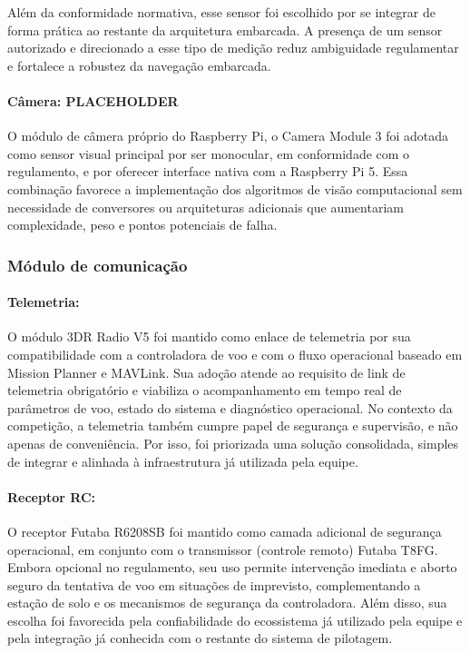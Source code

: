 Além da conformidade normativa, esse sensor foi escolhido por se integrar de forma prática ao restante da arquitetura embarcada. A presença de um sensor autorizado e direcionado a esse tipo de medição reduz ambiguidade regulamentar e fortalece a robustez da navegação embarcada.

\paragraph{Câmera: PLACEHOLDER } 
O módulo de câmera próprio do Raspberry Pi, o Camera Module 3 foi adotada como sensor visual principal por ser monocular, em conformidade com o regulamento, e por oferecer interface nativa com a Raspberry Pi 5. Essa combinação favorece a implementação dos algoritmos de visão computacional sem necessidade de conversores ou arquiteturas adicionais que aumentariam complexidade, peso e pontos potenciais de falha.

\subsubsection{Módulo de comunicação}

\paragraph{Telemetria:}
O módulo 3DR Radio V5 foi mantido como enlace de telemetria por sua compatibilidade com a controladora de voo e com o fluxo operacional baseado em Mission Planner e MAVLink. Sua adoção atende ao requisito de link de telemetria obrigatório e viabiliza o acompanhamento em tempo real de parâmetros de voo, estado do sistema e diagnóstico operacional. No contexto da competição, a telemetria também cumpre papel de segurança e supervisão, e não apenas de conveniência. Por isso, foi priorizada uma solução consolidada, simples de integrar e alinhada à infraestrutura já utilizada pela equipe.

\paragraph{Receptor RC:}
O receptor Futaba R6208SB foi mantido como camada adicional de segurança operacional, em conjunto com o transmissor (controle remoto) Futaba T8FG. Embora opcional no regulamento, seu uso permite intervenção imediata e aborto seguro da tentativa de voo em situações de imprevisto, complementando a estação de solo e os mecanismos de segurança da controladora. Além disso, sua escolha foi favorecida pela confiabilidade do ecossistema já utilizado pela equipe e pela integração já conhecida com o restante do sistema de pilotagem.

